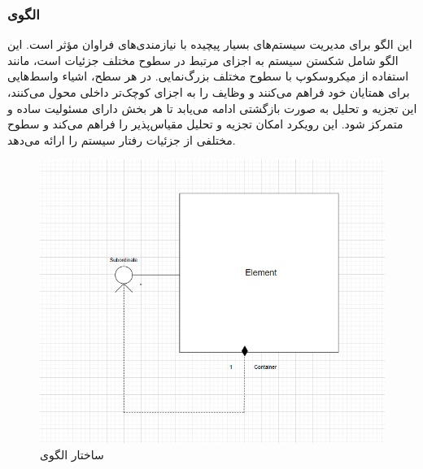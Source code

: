 \subsubsection{الگوی }
\label{archRecContainSec}
\begin{RTL}
این الگو \cite{ref4} برای مدیریت سیستم‌های بسیار پیچیده
با نیازمندی‌های فراوان مؤثر است. این الگو شامل شکستن سیستم به
اجزای مرتبط در سطوح مختلف جزئیات است، مانند استفاده از میکروسکوپ
با سطوح مختلف بزرگ‌نمایی. در هر سطح، اشیاء واسط‌هایی
برای همتایان خود فراهم می‌کنند و وظایف را به اجزای کوچک‌تر داخلی
محول می‌کنند، این تجزیه و تحلیل به صورت بازگشتی ادامه می‌یابد
تا هر بخش دارای مسئولیت ساده و متمرکز شود. این رویکرد امکان تجزیه
و تحلیل مقیاس‌پذیر را فراهم می‌کند و سطوح مختلفی از جزئیات رفتار سیستم را ارائه می‌دهد.
\end{RTL}
\begin{figure}[h!]
\centering
\includegraphics[scale=0.5]{images/first/recursive_contain.png}
\caption{ساختار الگوی }
\end{figure}